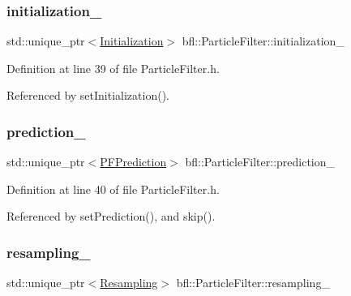 \subsubsection{\texorpdfstring{initialization\+\_\+}{initialization\_}}
{\footnotesize\ttfamily std\+::unique\+\_\+ptr$<$\mbox{\hyperlink{classbfl_1_1Initialization}{Initialization}}$>$ bfl\+::\+Particle\+Filter\+::initialization\+\_\+\hspace{0.3cm}{\ttfamily [protected]}}



Definition at line 39 of file Particle\+Filter.\+h.



Referenced by set\+Initialization().

\mbox{\label{classbfl_1_1ParticleFilter_ab86f707d29a823423fe35de37e8f9d8e}} 
\subsubsection{\texorpdfstring{prediction\+\_\+}{prediction\_}}
{\footnotesize\ttfamily std\+::unique\+\_\+ptr$<$\mbox{\hyperlink{classbfl_1_1PFPrediction}{P\+F\+Prediction}}$>$ bfl\+::\+Particle\+Filter\+::prediction\+\_\+\hspace{0.3cm}{\ttfamily [protected]}}



Definition at line 40 of file Particle\+Filter.\+h.



Referenced by set\+Prediction(), and skip().

\mbox{\label{classbfl_1_1ParticleFilter_a9b0b855942fa4fb847443b10fe26c589}} 
\subsubsection{\texorpdfstring{resampling\+\_\+}{resampling\_}}
{\footnotesize\ttfamily std\+::unique\+\_\+ptr$<$\mbox{\hyperlink{classbfl_1_1Resampling}{Resampling}}$>$ bfl\+::\+Particle\+Filter\+::resampling\+\_\+\hspace{0.3cm}{\ttfamily [protected]}}



